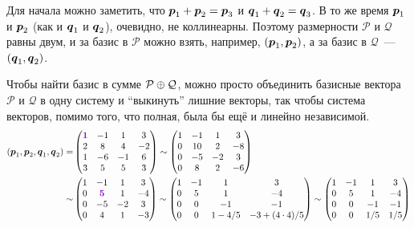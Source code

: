 \documentclass[a4paper,12pt]{article}
\begin{document}
  \begin{solution}
    Для начала можно заметить, что $\bds p_1 \hm+ \bds p_2 \hm= \bds p_3$ и $\bds q_1 \hm+ \bds q_2 \hm= \bds q_3$.
    В то же время $\boldsymbol p_1$ и $\boldsymbol p_2$ (как и $\boldsymbol q_1$ и $\boldsymbol q_2$), очевидно, не коллинеарны.
    Поэтому размерности $\mathcal P$ и $\mathcal Q$ равны двум, и за базис в $\mathcal P$ можно взять, например, $(\boldsymbol p_1, \boldsymbol p_2)$, а за базис в $\mathcal Q$~---~$(\boldsymbol q_1, \boldsymbol q_2)$.
    
    Чтобы найти базис в сумме $\mathcal P \hm\oplus \mathcal Q$, можно просто объединить базисные вектора $\mathcal P$ и $\mathcal Q$ в одну систему и ``выкинуть'' лишние векторы, так чтобы система векторов, помимо того, что полная, была бы ещё и линейно независимой.
    \begin{equation*}
    \begin{split}
      (\bds p_1, \bds p_2, \bds q_1, \bds q_2) = &\begin{pmatrix}
        \textcolor{violet}{\bds 1} & -1 & 1 & 3\\
        2 & 8 & 4 & -2\\
        1 & -6 & -1 & 6\\
        3 & 5 & 5 & 3
      \end{pmatrix} \sim \begin{pmatrix}
        1 & -1 & 1 & 3\\
        0 & 10 & 2 & -8\\
        0 & -5 & -2 & 3\\
        0 & 8 & 2 & -6
      \end{pmatrix}\\
      \sim &\begin{pmatrix}
        1 & -1 & 1 & 3\\
        0 & \textcolor{violet}{\bds 5} & 1 & -4\\
        0 & -5 & -2 & 3\\
        0 & 4 & 1 & -3
      \end{pmatrix} \sim \begin{pmatrix}
        1 & -1 & 1 & 3\\
        0 & 5 & 1 & -4\\
        0 & 0 & -1 & -1\\
        0 & 0 & 1 - 4/5 & -3 + (4 \cdot 4)/5
      \end{pmatrix} \sim \begin{pmatrix}
        1 & -1 & 1 & 3\\
        0 & 5 & 1 & -4\\
        0 & 0 & -1 & -1\\
        0 & 0 & 1/5 & 1/5
      \end{pmatrix}
    \end{split}
    \end{equation*}
    

\end{solution}
\end{document}
